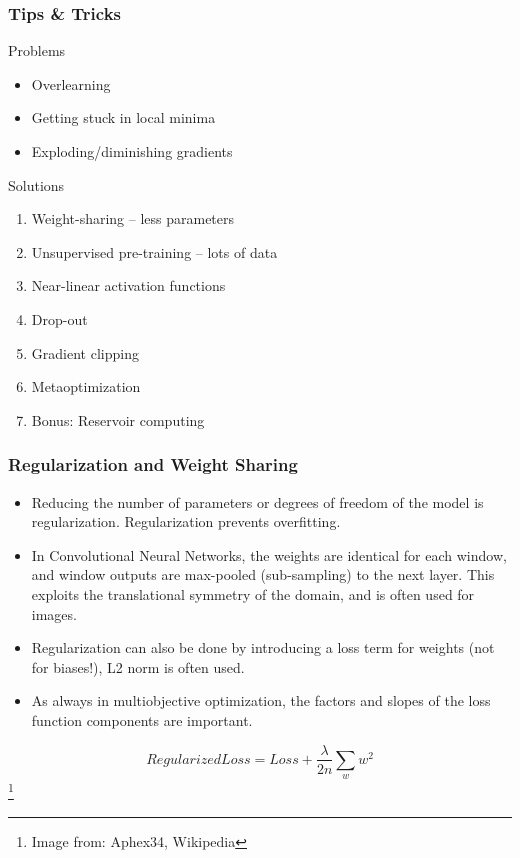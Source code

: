 \documentclass[8pt]{beamer}
\begin{document}
\begin{frame}
\frametitle{Tips \& Tricks}
 \begin{block}{Problems}
  \begin{itemize}
   \item Overlearning
   \item Getting stuck in local minima
   \item Exploding/diminishing gradients
  \end{itemize}
 \end{block}

 \begin{block}{Solutions}
  \begin{enumerate}
   \item Weight-sharing – less parameters
   \item Unsupervised pre-training – lots of data
   \item Near-linear activation functions
   \item Drop-out
   \item Gradient clipping
   \item Metaoptimization
   \item Bonus: Reservoir computing 
  \end{enumerate}
 \end{block}

\end{frame}

\begin{frame}
\frametitle{Regularization and Weight Sharing}
 \begin{itemize}
  \item Reducing the number of parameters or degrees of freedom of the model is regularization. Regularization prevents overfitting.
  \item In Convolutional Neural Networks, the weights are identical for each window, and window outputs are max-pooled (sub-sampling) to the next layer.
        This exploits the translational symmetry of the domain, and is often used for images.
  \item Regularization can also be done by introducing a loss term for weights (not for biases!), L2 norm is often used.
  \item As always in multiobjective optimization, the factors and slopes of the loss function components are important.
 \end{itemize}
 \begin{displaymath}
  RegularizedLoss = Loss + \frac{\lambda}{2n} \sum\limits_w w^2 
 \end{displaymath}
 \footnote{Image from: Aphex34, Wikipedia}
\end{frame}
\end{document}
